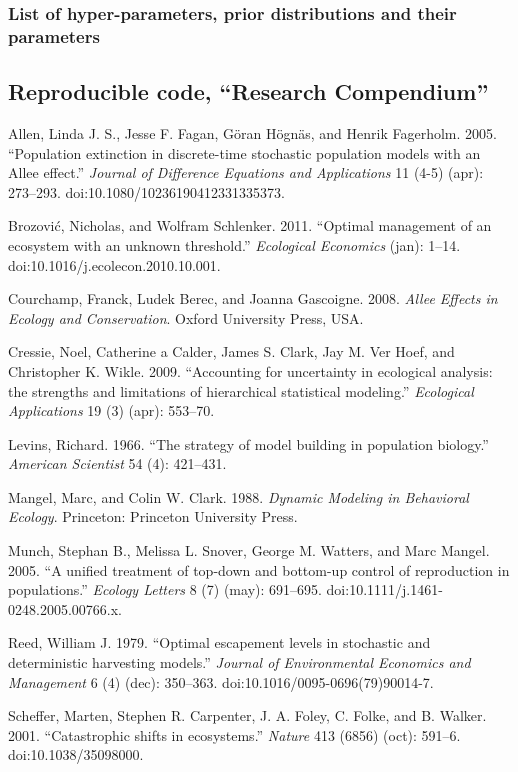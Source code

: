 \documentclass[author-year, review]{elsarticle} %
\begin{document}
\subsubsection{List of hyper-parameters, prior distributions and their
parameters}

\subsection{Reproducible code, ``Research Compendium''}

Allen, Linda J. S., Jesse F. Fagan, Göran Högnäs, and Henrik Fagerholm.
2005. ``Population extinction in discrete-time stochastic population
models with an Allee effect.'' \emph{Journal of Difference Equations and
Applications} 11 (4-5) (apr): 273--293.
doi:10.1080/10236190412331335373.

Brozović, Nicholas, and Wolfram Schlenker. 2011. ``Optimal management of
an ecosystem with an unknown threshold.'' \emph{Ecological Economics}
(jan): 1--14. doi:10.1016/j.ecolecon.2010.10.001.

Courchamp, Franck, Ludek Berec, and Joanna Gascoigne. 2008. \emph{Allee
Effects in Ecology and Conservation}. Oxford University Press, USA.

Cressie, Noel, Catherine a Calder, James S. Clark, Jay M. Ver Hoef, and
Christopher K. Wikle. 2009. ``Accounting for uncertainty in ecological
analysis: the strengths and limitations of hierarchical statistical
modeling.'' \emph{Ecological Applications} 19 (3) (apr): 553--70.

Levins, Richard. 1966. ``The strategy of model building in population
biology.'' \emph{American Scientist} 54 (4): 421--431.

Mangel, Marc, and Colin W. Clark. 1988. \emph{Dynamic Modeling in
Behavioral Ecology}. Princeton: Princeton University Press.

Munch, Stephan B., Melissa L. Snover, George M. Watters, and Marc
Mangel. 2005. ``A unified treatment of top-down and bottom-up control of
reproduction in populations.'' \emph{Ecology Letters} 8 (7) (may):
691--695. doi:10.1111/j.1461-0248.2005.00766.x.

Reed, William J. 1979. ``Optimal escapement levels in stochastic and
deterministic harvesting models.'' \emph{Journal of Environmental
Economics and Management} 6 (4) (dec): 350--363.
doi:10.1016/0095-0696(79)90014-7.

Scheffer, Marten, Stephen R. Carpenter, J. A. Foley, C. Folke, and B.
Walker. 2001. ``Catastrophic shifts in ecosystems.'' \emph{Nature} 413
(6856) (oct): 591--6. doi:10.1038/35098000.
\end{document}
